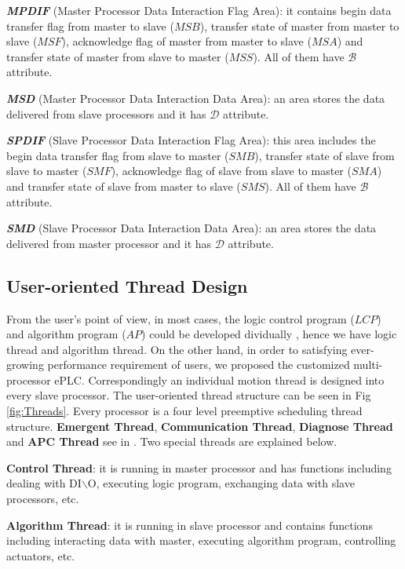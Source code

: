 \documentclass[journal,UTF8]{IEEEtran}
\begin{document}
\textbf{\emph{MPDIF}} (Master Processor Data Interaction Flag Area): it contains begin data transfer flag from master to slave ($MSB$), transfer state of master from master to slave ($MSF$), acknowledge flag of master from master to slave ($MSA$) and transfer state of master from slave to master ($MSS$). All of them have $\mathcal{B}$ attribute.

\textbf{\emph{MSD}} (Master Processor Data Interaction Data Area): an area stores the data delivered from slave processors and it has $\mathcal{D}$ attribute.

\textbf{\emph{SPDIF}} (Slave Processor Data Interaction Flag Area): this area includes the begin data transfer flag from slave to master ($SMB$), transfer state of slave from slave to master ($SMF$), acknowledge flag of slave from slave to master ($SMA$) and transfer state of slave from master to slave ($SMS$). All of them have $\mathcal{B}$ attribute.

\textbf{\emph{SMD}} (Slave Processor Data Interaction Data Area): an area stores the data delivered from master processor and it has $\mathcal{D}$ attribute.

\subsection{User-oriented Thread Design}
From the user's point of view, in most cases, the logic control program ($LCP$) and algorithm program ($AP$) could be developed dividually \cite{WuA}, hence we have logic thread and algorithm thread. On the other hand, in order to satisfying ever-growing performance requirement of users, we proposed the customized multi-processor ePLC. Correspondingly 
an individual motion thread is designed into every slave processor. The user-oriented thread structure can be seen in Fig \ref{fig:Threads}. Every processor is a four level preemptive scheduling thread structure. \textbf{Emergent Thread}, \textbf{Communication Thread}, \textbf{Diagnose Thread} and \textbf{APC Thread} see in \cite{WuA}. Two special threads are explained below.

\textbf{Control Thread}: it is running in master processor and has functions including dealing with DI$\backslash$O, executing logic program, exchanging data with slave processors, etc.

\textbf{Algorithm Thread}: it is running in slave processor and contains functions including interacting data with master, executing algorithm program, controlling actuators, etc.
\end{document}
